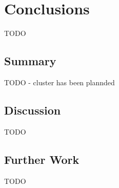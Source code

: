 \chapter{Conclusions}
\label{chap:conc}

TODO

\section{Summary}

TODO
- cluster has been plannded

\section{Discussion}

TODO

\section{Further Work}

TODO
